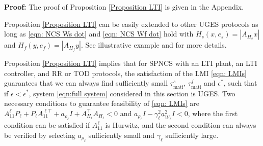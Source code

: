 \textbf{Proof:} The proof of Proposition \ref{Proposition LTI} is given in the Appendix.
\begin{rem}
    Proposition \ref{Proposition LTI} can be easily extended to other UGES protocols as long as \eqref{eqn: NCS Ws dot} and \eqref{eqn: NCS Wf dot} hold with $H_s(x,e_s) = \left| A_{H_s} x \right|$ and $H_f(y,e_f) = \left| A_{H_f} y \right|$. See illustrative example and \cite{nesic2009unified} for more details.
\end{rem}
%
Proposition \ref{Proposition LTI} implies that for SPNCS with an LTI plant, an LTI controller, and RR or TOD protocols, the satisfaction of the LMI \eqref{eqn: LMIs} guarantees that we can always find sufficiently small $\tau_{\text{mati}}^s$, $\tau_{\text{mati}}^f$ and $\epsilon^*$, such that if $\epsilon < \epsilon^*$, system \eqref{eqn:full system} considered in this section is UGES. Two necessary conditions to guarantee feasibility of \eqref{eqn: LMIs} are $A_{11}^{\ell} P_\ell + P_\ell A_{11}^{\ell\top} + a_{\rho_\ell} I + A_{H_\ell}^\top A_{H_\ell} < 0 $ and $a_{\rho_\ell} I - \gamma_\ell^2 \underline{a}_{W_\ell}^2 I <0$, where the first condition can be satisfied if $A_{11}^{\ell}$ is Hurwitz, and the second condition can always be verified by selecting $a_{\rho_\ell}$ sufficiently small and $\gamma_{\ell}$ sufficiently large.




